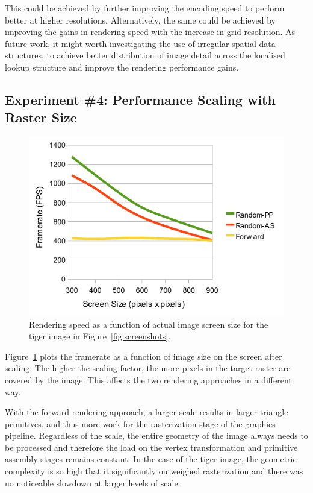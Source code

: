 \documentclass[11pt,a4paper,twoside]{article}
\begin{document}
This could be achieved by further improving the encoding speed to perform better at higher resolutions. Alternatively, the same could be achieved by improving the gains in rendering speed with the increase in grid resolution. As future work, it might worth investigating the use of irregular spatial data structures, to achieve better distribution of image detail across the localised lookup structure and improve the rendering performance gains.

\subsection {Experiment \#4: Performance Scaling with Raster Size}

\begin {figure} [h]
	\centering
	\includegraphics[width=0.6\columnwidth] {figures/graph_size_render}
	\caption {Rendering speed as a function of actual image screen size for the tiger image in Figure~\ref{fig:screenshots}.}
	\label {fig:graph_size_render}
\end {figure}

Figure~\ref{fig:graph_size_render} plots the framerate as a function of image size on the screen after scaling. The higher the scaling factor, the more pixels in the target raster are covered by the image. This affects the two rendering approaches in a different way.

With the forward rendering approach, a larger scale results in larger triangle primitives, and thus more work for the rasterization stage of the graphics pipeline. Regardless of the scale, the entire geometry of the image always needs to be processed and therefore the load on the vertex transformation and primitive assembly stages remains constant. In the case of the tiger image, the geometric complexity is so high that it significantly outweighed rasterization and there was no noticeable slowdown at larger levels of scale.
\end{document}
